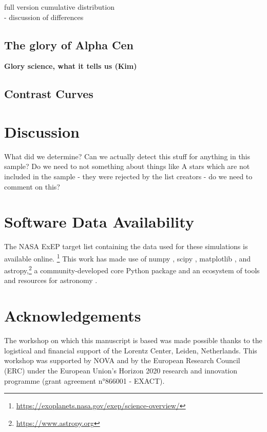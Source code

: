 \documentclass[
    usenatbib,
]{mnras}
\begin{document}
full version cumulative distribution \\
- discussion of differences \\

\subsection{The glory of Alpha Cen}
\label{sec:ealpha-cen}
\textbf{Glory science, what it tells us (Kim)}

\subsection{Contrast Curves}
\label{sec:contrast}

\section{Discussion}
What did we determine? Can we actually detect this stuff for anything in this sample? Do we need to not something about things like A stars which are not included in the sample - they were rejected by the list creators - do we need to comment on this? 



\section*{Software Data Availability}
The NASA ExEP target list containing the data used for these simulations is available online.%
\footnote{\url{https://exoplanets.nasa.gov/exep/science-overview/}}
This work has made use of \textsf{numpy}
 \citep{NumPy2020}, \textsf{scipy} \citep{scipy_2020}, \textsf{matplotlib} \citep{matplotlib2007}, and \textsf{astropy},\footnote{\url{https://www.astropy.org}} a community-developed core Python package and an ecosystem of tools and resources for astronomy \citep{astropy:2013, astropy:2018, astropy:2022}.




\section*{Acknowledgements}
The workshop on which this manuscript is based was made possible thanks to the logistical and financial support of the Lorentz Center, Leiden, Netherlands. This workshop was supported by NOVA  and by the European Research Council (ERC) under the European Union's Horizon 2020 research and innovation programme (grant agreement n°866001 - EXACT).
\end{document}
